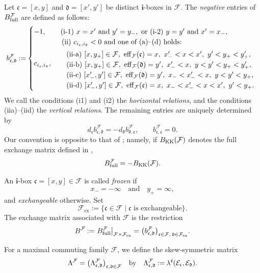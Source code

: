 \documentclass[12pt, leqno]{amsart}
\numberwithin{equation}{section}
\theoremstyle{plain}
\theoremstyle{definition}
\newcommand{\seteq}{\mathbin{:=}}
\newcommand{\ex}{\mathrm{ex}}
\newcommand{\full}{{\rm full}}
\newcommand{\ii}{ \textbf{\textit{i}}}
\newcommand{\eff}{\operatorname{eff}}
\newcommand{\frakc}{\mathfrak{c}}
\newcommand{\frakd}{\mathfrak{d}}
\newcommand{\bfi}{\mathbf{i}}
\newcommand{\calE}{\mathcal{E}}
\newcommand{\calF}{\mathcal{F}}
\newcommand{\qtq}[1][{and}]{\quad\text{{#1}}\quad}
\begin{document}
Let $\frakc=[x,y]$ and  $\frakd=[x',y']$ be distinct $\bfi$-boxes in $\calF$. The \emph{negative} entries of
$B^\calF_{\full}$ are defined as follows:
\begin{equation}\label{eq: full ibox exchange matrix}
b^\calF_{\frakc,\frakd}
\seteq
\begin{cases}
-1, & \ {\rm (i\text{-}1)} \ x=x' \text{ and } y'=y_-, \text{ or } {\rm (i\text{-}2)} \ y=y' \text{ and } x'=x_-,  \\
c_{i_{\frakc},i_{\frakd}}, &
\begin{array}{l}
{\rm (ii)} \ c_{i_{\frakc},i_{\frakd}}<0
\text{ and one of {\rm (a)--(d)} holds:}
\\[1mm]
\ \ {\rm (ii\text{-}a)}\ [x,y_+]\in\calF,\  \eff_\calF(\frakc)=x,\  x'_-<x<x',\ y'<y_+<y'_+, \\
\ \ {\rm (ii\text{-}b)}\ [x,y_+]\in\calF,\  \eff_\calF(\frakd)=y',\ x'_-<x,\  y<y'<y_+<y'_+, \\
\ \ {\rm (ii\text{-}c)}\ [x'_-,y']\in\calF,\  \eff_\calF(\frakd)=y',\ x_-<x'_-<x,\ y<y'<y_+, \\
\ \ {\rm (ii\text{-}d)}\ [x'_-,y']\in\calF,\  \eff_\calF(\frakc)=x,\ x_-<x'_-<x<x',\ y'<y_+.
\end{array}
\end{cases}
\end{equation}
We call the conditions {\rm (i\text{-}1)} and {\rm (i\text{-}2)}
the \emph{horizontal relations}, and the conditions
{\rm (ii\text{-}a)}--{\rm (ii\text{-}d)} the \emph{vertical relations}.
The remaining entries are uniquely determined by
\[
d_{\frakc}b^\calF_{\frakc,\frakd} = -d_{\frakd}b^\calF_{\frakd,\frakc}, \qquad b^\calF_{\frakc,\frakc}=0.
\]
Our convention is opposite to that of \cite[Section~3.2]{KK24}; namely, if $B_{\rm KK}(\calF)$ denotes the full exchange matrix
defined in \cite[Section~3.2]{KK24},
\[
B^\calF_{\full}=-B_{\rm KK}(\calF).
\]

An $\bfi$-box $\frakc=[x,y]\in\calF$ is called \emph{frozen} if
\[
x_-=-\infty \qtq y_+=\infty,
\]
and \emph{exchangeable} otherwise. Set
\[
\calF_{\ex}\seteq \{\frakc\in\calF\mid \frakc\text{ is exchangeable}\}.
\]
The exchange matrix associated with $\calF$ is the restriction
\[
B^\calF \seteq \left.B^\calF_{\full}\right|_{\calF\times\calF_{\ex}}
= \bigl(b^\calF_{\frakc,\frakd}\bigr)_{\frakc\in\calF,\,\frakd\in\calF_{\ex}}.
\]

For a maximal commuting family $\calF$, we define the skew-symmetric matrix
\begin{equation}\label{eq: ibox Lambda matrix}
\Lambda^\calF = \bigl(\Lambda^\calF_{\frakc,\frakd}\bigr)_{\frakc,\frakd\in\calF}
\ \  \text{ by } \ \   \Lambda^\calF_{\frakc,\frakd} \seteq \lambda^\ii(\calE_{\frakc},\calE_{\frakd}).
\end{equation}
\end{document}
